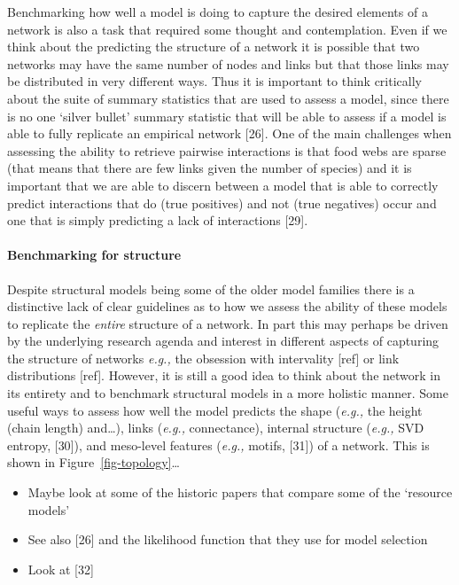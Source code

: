 \documentclass[
]{article}
\let\oldparagraph\paragraph
\renewcommand{\paragraph}[1]{\oldparagraph{#1}\mbox{}}
\begin{document}
Benchmarking how well a model is doing to capture the desired elements
of a network is also a task that required some thought and
contemplation. Even if we think about the predicting the structure of a
network it is possible that two networks may have the same number of
nodes and links but that those links may be distributed in very
different ways. Thus it is important to think critically about the suite
of summary statistics that are used to assess a model, since there is no
one `silver bullet' summary statistic that will be able to assess if a
model is able to fully replicate an empirical network {[}26{]}. One of
the main challenges when assessing the ability to retrieve pairwise
interactions is that food webs are sparse (that means that there are few
links given the number of species) and it is important that we are able
to discern between a model that is able to correctly predict
interactions that do (true positives) and not (true negatives) occur and
one that is simply predicting a lack of interactions {[}29{]}.

\paragraph{Benchmarking for structure}\label{benchmarking-for-structure}

Despite structural models being some of the older model families there
is a distinctive lack of clear guidelines as to how we assess the
ability of these models to replicate the \emph{entire} structure of a
network. In part this may perhaps be driven by the underlying research
agenda and interest in different aspects of capturing the structure of
networks \emph{e.g.,} the obsession with intervality {[}ref{]} or link
distributions {[}ref{]}. However, it is still a good idea to think about
the network in its entirety and to benchmark structural models in a more
holistic manner. Some useful ways to assess how well the model predicts
the shape (\emph{e.g.,} the height (chain length) and\ldots), links
(\emph{e.g.,} connectance), internal structure (\emph{e.g.,} SVD
entropy, {[}30{]}), and meso-level features (\emph{e.g.,} motifs,
{[}31{]}) of a network. This is shown in
Figure~\ref{fig-topology}\ldots{}

\begin{itemize}
\item
  Maybe look at some of the historic papers that compare some of the
  `resource models'
\item
  See also {[}26{]} and the likelihood function that they use for model
  selection
\item
  Look at {[}32{]}
\end{itemize}
\end{document}
